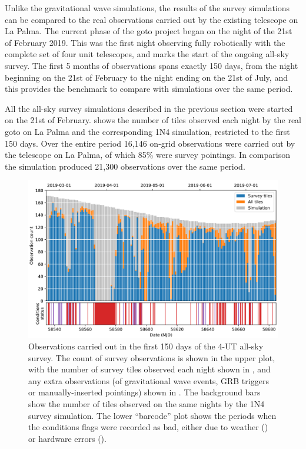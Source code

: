 \begin{colsection}
\begin{colsection}
Unlike the gravitational wave simulations, the results of the survey simulations can be compared to the real observations carried out by the existing telescope on La Palma. The current phase of the \gls{goto} project began on the night of the 21st of February 2019. This was the first night observing fully robotically with the complete set of four unit telescopes, and marks the start of the ongoing all-sky survey. The first 5 months of observations spans exactly 150 days, from the night beginning on the 21st of February to the night ending on the 21st of July, and this provides the benchmark to compare with simulations over the same period.

All the all-sky survey simulations described in the previous section were started on the 21st of February.  shows the number of tiles observed each night by the real \gls{goto} on La Palma and the corresponding 1N4 simulation, restricted to the first 150 days. Over the entire period 16,146 on-grid observations were carried out by the telescope on La Palma, of which 85\% were survey pointings. In comparison the simulation produced 21,300 observations over the same period.

\begin{figure}[t]
    \begin{center}
        \includegraphics[width=\linewidth]{images/150.pdf}
    \end{center}
    \caption[Observations carried out in the first 150 days of the 4-UT all-sky survey]{
        Observations carried out in the first 150 days of the 4-UT all-sky survey. The count of survey observations is shown in the upper plot, with the number of survey tiles observed each night shown in , and any extra observations (of gravitational wave events, GRB triggers or manually-inserted pointings) shown in . The background  bars show the number of tiles observed on the same nights by the 1N4 survey simulation. The lower ``barcode'' plot shows the periods when the conditions flags were recorded as bad, either due to weather () or hardware errors ().
    }\label{fig:150}
\end{figure}


\end{colsection}
\end{colsection}
